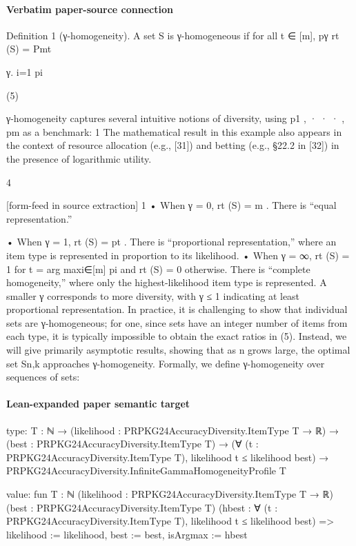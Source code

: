 \documentclass[10pt]{article}
\begin{document}
\paragraph{Verbatim paper-source connection}
\begin{ReviewVerbatim}
Definition 1 (γ-homogeneity). A set S is γ-homogeneous if for all t ∈ [m],
pγ
rt (S) = Pmt

γ.
i=1 pi

(5)

γ-homogeneity captures several intuitive notions of diversity, using p1 , · · · , pm as a benchmark:
1 The mathematical result in this example also appears in the context of resource allocation (e.g., [31]) and betting (e.g.,
§22.2 in [32]) in the presence of logarithmic utility.

4


[form-feed in source extraction]
1
• When γ = 0, rt (S) = m
. There is “equal representation.”

• When γ = 1, rt (S) = pt . There is “proportional representation,” where an item type is represented in
proportion to its likelihood.
• When γ = ∞, rt (S) = 1 for t = arg maxi∈[m] pi and rt (S) = 0 otherwise. There is “complete homogeneity,”
where only the highest-likelihood item type is represented.
A smaller γ corresponds to more diversity, with γ ≤ 1 indicating at least proportional representation. In
practice, it is challenging to show that individual sets are γ-homogeneous; for one, since sets have an integer
number of items from each type, it is typically impossible to obtain the exact ratios in (5). Instead, we will give
primarily asymptotic results, showing that as n grows large, the optimal set Sn,k approaches γ-homogeneity.
Formally, we define γ-homogeneity over sequences of sets:
\end{ReviewVerbatim}



\paragraph{Lean-expanded paper semantic target}
\begin{ReviewVerbatim}
type:
{T : ℕ} →
  (likelihood : PRPKG24AccuracyDiversity.ItemType T → ℝ) →
    (best : PRPKG24AccuracyDiversity.ItemType T) →
      (∀ (t : PRPKG24AccuracyDiversity.ItemType T), likelihood t ≤ likelihood best) →
        PRPKG24AccuracyDiversity.InfiniteGammaHomogeneityProfile T

value:
fun {T : ℕ} (likelihood : PRPKG24AccuracyDiversity.ItemType T → ℝ) (best : PRPKG24AccuracyDiversity.ItemType T)
    (hbest : ∀ (t : PRPKG24AccuracyDiversity.ItemType T), likelihood t ≤ likelihood best) =>
  { likelihood := likelihood, best := best, isArgmax := hbest }
\end{ReviewVerbatim}
\end{document}
